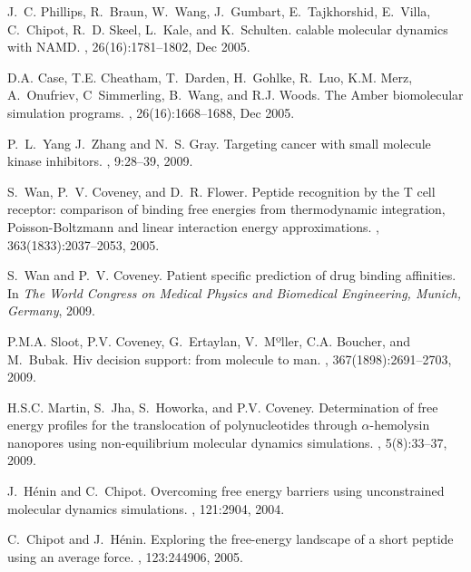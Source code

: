 \begin{thebibliography}{10}
J.~C. Phillips, R.~Braun, W.~Wang, J.~Gumbart, E.~Tajkhorshid, E.~Villa,
  C.~Chipot, R.~D. Skeel, L.~Kale, and K.~Schulten.
calable molecular dynamics with {NAMD}.
, 26(16):1781--1802, Dec
  2005.

D.A. Case, T.E. Cheatham, T.~Darden, H.~Gohlke, R.~Luo, K.M. Merz, A.~Onufriev,
  C~Simmerling, B.~Wang, and R.J. Woods.
\newblock The {A}mber biomolecular simulation programs.
, 26(16):1668--1688, Dec 2005.

P.~L.~Yang J.~Zhang and N.~S. Gray.
\newblock Targeting cancer with small molecule kinase inhibitors.
, 9:28--39, 2009.

S.~Wan, P.~V. Coveney, and D.~R. Flower.
\newblock Peptide recognition by the {T} cell receptor: comparison of binding
  free energies from thermodynamic integration, {Poisson-Boltzmann} and linear
  interaction energy approximations.
, 363(1833):2037--2053, 2005.

S.~Wan and P.~V. Coveney.
\newblock Patient specific prediction of drug binding affinities.
\newblock In {\em The World Congress on Medical Physics and Biomedical
  Engineering, Munich, Germany}, 2009.

P.M.A. Sloot, P.V. Coveney, G.~Ertaylan, V.~Mºller, C.A. Boucher, and
  M.~Bubak.
\newblock Hiv decision support: from molecule to man.
, 367(1898):2691--2703, 2009.

H.S.C. Martin, S.~Jha, S.~Howorka, and P.V. Coveney.
\newblock Determination of free energy profiles for the translocation of
  polynucleotides through $\alpha$-hemolysin nanopores using non-equilibrium
  molecular dynamics simulations.
, 5(8):33--37, 2009.

J.~H{\'e}nin and C.~Chipot.
\newblock Overcoming free energy barriers using unconstrained molecular
  dynamics simulations.
, 121:2904, 2004.

C.~Chipot and J.~H{\'e}nin.
\newblock Exploring the free-energy landscape of a short peptide using an
  average force.
, 123:244906, 2005.


\end{thebibliography}
